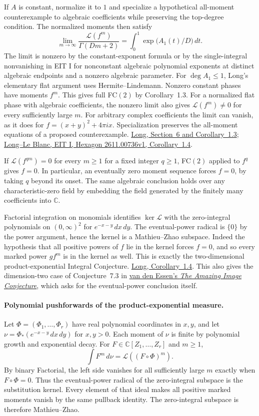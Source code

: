 \documentclass[11pt]{article}
\newcommand{\Lfac}{\mathcal L}
\newcommand{\C}{\mathbb C}
\begin{document}
If $A$ is constant, normalize it to $1$ and specialize a hypothetical
all-moment counterexample to algebraic coefficients while preserving
the top-degree condition. The normalized moments then satisfy
\[
 \lim_{m\to\infty}\frac{\Lfac(f^m)}{\Gamma(Dm+2)}
   =\int_0^1 \exp\bigl(A_1(t)/D\bigr)\,dt.
\]
The limit is nonzero by the constant-exponent formula or by the
single-integral nonvanishing in EIT I for nonconstant algebraic
polynomial exponents at distinct algebraic endpoints and a nonzero
algebraic parameter. For $\deg A_1\leq 1$, Long's elementary flat
argument uses Hermite--Lindemann. Nonzero constant phases have moments
$f^m$. This gives full FC$(2)$ by Corollary~1.3. For a normalized flat
phase with algebraic coefficients, the nonzero limit also gives
$\Lfac(f^m)\ne 0$ for every sufficiently large $m$. For arbitrary complex
coefficients the limit can vanish, as it does for
$f=(x+y)^2+4\pi i x$. Specialization preserves the all-moment equations
of a proposed counterexample.
\href{https://hexagonmath.org/2611.00813v1}{Long, Section~6 and
Corollary~1.3};
\href{https://hexagonmath.org/2611.00736v1}{Long--Le Blanc, EIT I,
Hexagon 2611.00736v1, Corollary~1.4}.

If $\Lfac(f^{qm})=0$ for every $m\geq 1$ for a fixed integer $q\geq 1$,
FC$(2)$ applied to $f^q$ gives $f=0$. In particular, an eventually zero
moment sequence forces $f=0$, by taking $q$ beyond its onset. The same
algebraic conclusion holds over any characteristic-zero field by embedding
the field generated by the finitely many coefficients into $\C$.

Factorial integration on monomials identifies $\ker\Lfac$ with the
zero-integral polynomials on $(0,\infty)^2$ for $e^{-x-y}\,dx\,dy$.
The eventual-power radical is $\{0\}$ by the power argument, hence the
kernel is a Mathieu--Zhao subspace. Indeed the hypothesis that all
positive powers of $f$ lie in the kernel forces $f=0$, and so every
marked power $gf^m$ is in the kernel as well. This is exactly the
two-dimensional product-exponential Integral Conjecture.
\href{https://hexagonmath.org/2611.00813v1}{Long, Corollary~1.4}.
This also gives the dimension-two case of Conjecture~7.3 in
\href{https://arxiv.org/abs/1006.5801v1}{van den Essen's \emph{The Amazing
Image Conjecture}}, which asks for the eventual-power conclusion itself.

\paragraph{Polynomial pushforwards of the product-exponential measure.}
Let $\Phi=(\Phi_1,\ldots,\Phi_r)$ have real polynomial coordinates in
$x,y$, and let $\nu=\Phi_*(e^{-x-y}\,dx\,dy)$ for $x,y>0$. Each moment
of $\nu$ is finite by polynomial growth and exponential decay. For
$F\in\C[Z_1,\ldots,Z_r]$ and $m\geq1$,
\[
 \int F^m\,d\nu=\Lfac((F\circ\Phi)^m).
\]
By binary Factorial, the left side vanishes for all sufficiently large
$m$ exactly when $F\circ\Phi=0$. Thus the eventual-power radical of the
zero-integral subspace is the substitution kernel. Every element of that
ideal makes all positive marked moments vanish by the same pullback
identity. The zero-integral subspace is therefore Mathieu--Zhao.
\end{document}
